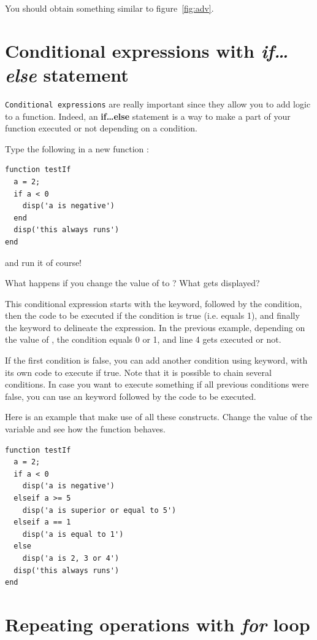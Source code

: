 \documentclass{article}
\begin{document}
You should obtain something similar to figure~\ref{fig:adv}.


\section{Conditional expressions with \emph{if\dots else} statement}

\verb|Conditional expressions| are really important since they allow you to add logic to a function.
Indeed, an \textbf{if\dots else} statement is a way to make a part of your function executed or not depending on a condition.

Type the following in a new function :
\begin{lstlisting}
function testIf
  a = 2;
  if a < 0
    disp('a is negative')
  end
  disp('this always runs')
end
\end{lstlisting}
and run it of course!

What happens if you change the value of  to ?
What gets displayed?

This conditional expression starts with the  keyword, followed by the condition, then the code to be executed if the condition is true (i.e. equals 1), and finally the  keyword to delineate the expression.
In the previous example, depending on the value of , the condition  equals 0 or 1, and line 4 gets executed or not.

If the first condition is false, you can add another condition using  keyword, with its own code to execute if true.
Note that it is possible to chain several  conditions.
In case you want to execute something if all previous conditions were false, you can use an  keyword followed by the code to be executed.

Here is an example that make use of all these constructs.
Change the value of the variable  and see how the function behaves.
\begin{lstlisting}
function testIf
  a = 2;
  if a < 0
    disp('a is negative')
  elseif a >= 5
    disp('a is superior or equal to 5')
  elseif a == 1
    disp('a is equal to 1')
  else
    disp('a is 2, 3 or 4')
  disp('this always runs')
end
\end{lstlisting}


\section{Repeating operations with \emph{for} loop}
\end{document}
